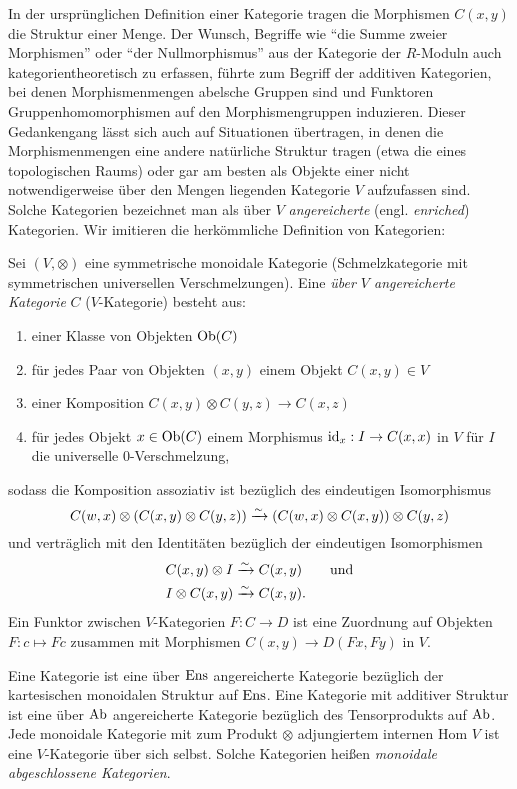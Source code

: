 In der ursprünglichen Definition einer Kategorie tragen die Morphismen
$C(x, y)$ die Struktur einer Menge. Der Wunsch, Begriffe wie ``die
Summe zweier Morphismen'' oder ``der Nullmorphismus'' aus der
Kategorie der $R$-Moduln auch kategorientheoretisch zu erfassen,
führte zum Begriff der additiven Kategorien, bei denen
Morphismenmengen abelsche Gruppen sind und Funktoren
Gruppenhomomorphismen auf den Morphismengruppen induzieren. Dieser
Gedankengang lässt sich auch auf Situationen übertragen, in denen die
Morphismenmengen eine andere natürliche Struktur tragen (etwa die
eines topologischen Raums) oder gar am besten als Objekte einer nicht
notwendigerweise über den Mengen liegenden Kategorie $V$ aufzufassen
sind. Solche Kategorien bezeichnet man als über $V$
\emph{angereicherte} (engl. \emph{enriched}) Kategorien. Wir imitieren
die herkömmliche Definition von Kategorien:
\begin{defn}
  Sei $(V, \otimes)$ eine symmetrische monoidale Kategorie
  (Schmelzkategorie mit symmetrischen universellen
  Verschmelzungen). Eine \emph{über $V$ angereicherte Kategorie} $C$
  ($V$-Kategorie) besteht aus:
  \begin{enumerate}
  \item einer Klasse von Objekten $\operatorname{Ob}(C)$
  \item für jedes Paar von Objekten $(x, y)$ einem Objekt $C(x,y) \in
    V$
  \item einer Komposition $C(x, y) \otimes C(y, z) \to C(x, z)$
  \item für jedes Objekt $x \in \operatorname{Ob}(C)$ einem Morphismus $\operatorname{id}_x: I \to
    C(x, x)$ in $V$ für $I$ die universelle 0-Verschmelzung,
  \end{enumerate}
  sodass die Komposition assoziativ ist bezüglich des eindeutigen
  Isomorphismus
  \[ C(w,x) \otimes (C(x,y) \otimes C(y,z))
  \xrightarrow[]{\sim} (C(w,x) \otimes C(x,y)) \otimes C(y,z)
  \]
  und verträglich mit den Identitäten bezüglich der eindeutigen
  Isomorphismen
  \begin{align*}
    C(x, y) \otimes I &\xrightarrow[]{\sim} C(x, y) \qquad \text{und} \\
    I \otimes C(x,y) &\xrightarrow[]{\sim} C(x, y).
  \end{align*}
  Ein Funktor zwischen $V$-Kategorien $F: C \to D$ ist eine Zuordnung
  auf Objekten $F: c \mapsto Fc$ zusammen mit Morphismen $C(x, y) \to
  D(Fx, Fy)$ in $V$.
\end{defn}
\begin{bsp}
  Eine Kategorie ist eine über $\operatorname{Ens}$ angereicherte Kategorie
  bezüglich der kartesischen monoidalen Struktur auf $\operatorname{Ens}$. Eine
  Kategorie mit additiver Struktur ist eine über $\operatorname{Ab}$ angereicherte
  Kategorie bezüglich des Tensorprodukts auf $\operatorname{Ab}$. Jede monoidale
  Kategorie mit zum Produkt $\otimes$ adjungiertem internen Hom $V$
  ist eine $V$-Kategorie über sich selbst. Solche Kategorien heißen
  \emph{monoidale abgeschlossene Kategorien}.
\end{bsp}

